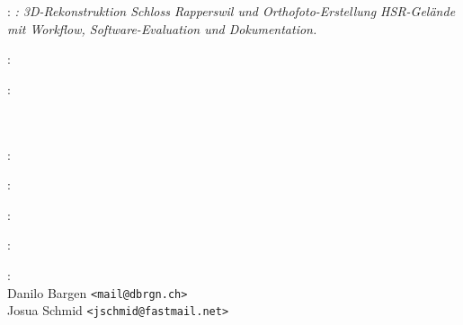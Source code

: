 
\thispagestyle{empty}

\hfill

\vfill

\noindent\myName: \textit{\myTitle: 3D-Rekonstruktion Schloss Rapperswil und
Orthofoto-Erstellung HSR-Gelände mit Workflow, Software-Evaluation und
Dokumentation.}
\textcopyright\ \myTime

\bigskip

\noindent{}: \\
\myHackerspace

\medskip

\noindent{}: \\
\myUni \\
\myFaculty \\
\myProf

\medskip

\noindent{}: \\
\myLocation

\medskip

\noindent{}: \\
\myTime

\medskip

\noindent{}: \\
\myLicense

\medskip

\noindent{}: \\
\myRepo

\medskip

\noindent{}: \\
Danilo Bargen \texttt{<mail@dbrgn.ch>}\\
Josua Schmid \texttt{<jschmid@fastmail.net>}
